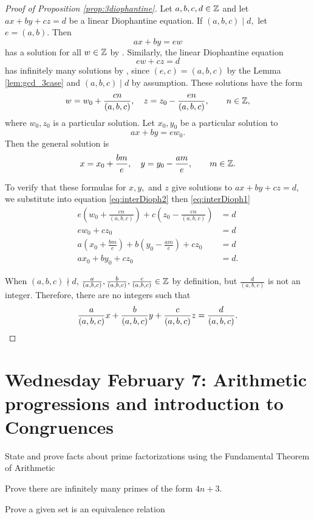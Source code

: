 \documentclass[letterpaper, 11 pt]{ximera}
\begin{document}
\begin{proof}[Proof of Proposition \ref{prop:3diophantine}]
    Let $a,b,c,d\in\mathbb Z$ and let $ax+by+cz=d$ be a linear Diophantine equation. If $(a,b,c)\mid d,$ let $e=(a,b).$ 
    Then \begin{equation}\label{eq:interDioph1}ax+by=ew\end{equation} has a solution for all $w\in\mathbb Z$ by .
    Similarly, the linear Diophantine equation \begin{equation}\label{eq:interDioph2}
        ew+cz=d
    \end{equation} has infinitely many solutions by , since $(e,c)=(a,b,c)$ by the Lemma \ref{lem:gcd_3case} and $(a,b,c)\mid d$ by assumption. These solutions have the form 
    \[w=w_0+\frac{cn}{(a,b,c)},\quad z=z_0-\frac{en}{(a,b,c)},\qquad n\in\mathbb Z,\]
    where $w_0,z_0$ is a particular solution. Let $x_0,y_0$ be a particular solution to \[ax+by=ew_0.\] Then the general solution is 
    \[x=x_0+\frac{bm}{e},\quad y=y_0-\frac{am}{e},\qquad m\in\mathbb Z.\]

    To verify that these formulas for $x,y,$ and $z$ give solutions to $ax+by+cz=d$, we substitute into equation \ref{eq:interDioph2} then \ref{eq:interDioph1}
    \begin{align*}
        e\left(w_0+\frac{cn}{(a,b,c)}\right)+c\left(z_0-\frac{en}{(a,b,c)}\right)&=d\\
        e w_0 + c z_0 & =d\\
        a\left(x_0+\frac{bm}{e}\right)+b\left(y_0-\frac{am}{e}\right)+cz _0 &=d\\
        ax_0+by_0+c z_0&=d.
    \end{align*}

    When $(a,b,c)\nmid d$, $\frac{a}{(a,b,c)},\frac{b}{(a,b,c)},\frac{c}{(a,b,c)}\in\mathbb Z$ by definition, but $\frac{d}{(a,b,c)}$ is not an integer. Therefore, there are no integers such that \[\frac{a}{(a,b,c)}x+\frac{b}{(a,b,c)}y+\frac{c}{(a,b,c)}z=\frac{d}{(a,b,c)}. \qedhere\] 
\end{proof}

\section{Wednesday February 7: Arithmetic progressions and introduction to Congruences}
\begin{obj}
    \item State and prove facts about prime factorizations using the Fundamental Theorem of Arithmetic
    \item Prove there are infinitely many primes of the form $4n+3$.
    \item Prove a given set is an equivalence relation
\end{obj}
\end{document}
